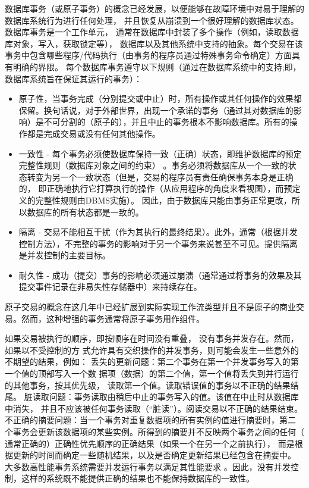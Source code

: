 数据库事务（或原子事务）的概念已经发展，以便能够在故障环境中对易于理解的数据库系统行为进行任何处理，
并且恢复从崩溃到一个很好理解的数据库状态。数据库事务是一个工作单元，
通常在数据库中封装了多个操作（例如，读取数据库对象，写入，获取锁定等），
数据库以及其他系统中支持的抽象。每个交易在该事务中包含哪些程序/代码执行（由事务的程序员通过特殊事务命令确定）方面具有明确的界限。
每个数据库事务遵守以下规则（通过在数据库系统中的支持;即，数据库系统旨在保证其运行的事务）：
\begin{itemize}
	\item 原子性，当事务完成（分别提交或中止）时，所有操作或其任何操作的效果都保留。换句话说，对于外部世界，出现一个承诺的事务（通过其对数据库的影响）是不可分割的（原子的），并且中止的事务根本不影响数据库。所有的操作都是完成交易或没有任何其他操作。
	\item 一致性 - 每个事务必须使数据库保持一致（正确）状态，即维护数据库的预定完整性规则（数据库对象之间的约束）
	。事务必须将数据库从一个一致的状态转变为另一个一致状态（但是，交易的程序员有责任确保事务本身是正确的，
	即正确地执行它打算执行的操作（从应用程序的角度来看视图），而预定义的完整性规则由DBMS实施）。
	因此，由于数据库只能由事务正常更改，所以数据库的所有状态都是一致的。
	\item 隔离 - 交易不能相互干扰（作为其执行的最终结果）。此外，通常（根据并发控制方法），不完整的事务的影响对于另一个事务来说甚至不可见。提供隔离是并发控制的主要目标。
	\item 耐久性 - 成功（提交）事务的影响必须通过崩溃（通常通过将事务的效果及其提交事件记录在非易失性存储器中）来持续存在。
\end{itemize}
原子交易的概念在这几年中已经扩展到实际实现工作流类型并且不是原子的商业交易。然而，这种增强的事务通常将原子事务用作组件。

如果交易被执行的顺序，即按顺序在时间没有重叠，
没有事务并发存在。然而，如果以不受控制的方
式允许具有交织操作的并发事务，则可能会发生一些意外的不期望的结果，例如：
丢失的更新问题：第二个事务在第一个并发事务写入的第一个值的顶部写入一个数
据项（数据）的第二个值，第一个值将丢失到并行运行的其他事务，按其优先级，
读取第一个值。读取错误值的事务以不正确的结果结尾。
脏读取问题：事务读取由稍后中止的事务写入的值。该值在中止时从数据库中消失，
并且不应该被任何事务读取（“脏读”）。阅读交易以不正确的结果结束。
不正确的摘要问题：当一个事务对重复数据项的所有实例的值进行摘要时，第二
个事务会更新该数据项的某些实例。所得到的摘要并不反映两个事务之间的任何（
通常正确的）正确性优先顺序的正确结果（如果一个在另一个之前执行），
而是根据更新的时间而确定一些随机结果，以及是否确定更新结果已经包含在摘要中。
大多数高性能事务系统需要并发运行事务以满足其性能要求
。因此，没有并发控制，这样的系统既不能提供正确的结果也不能保持数据库的一致性。



